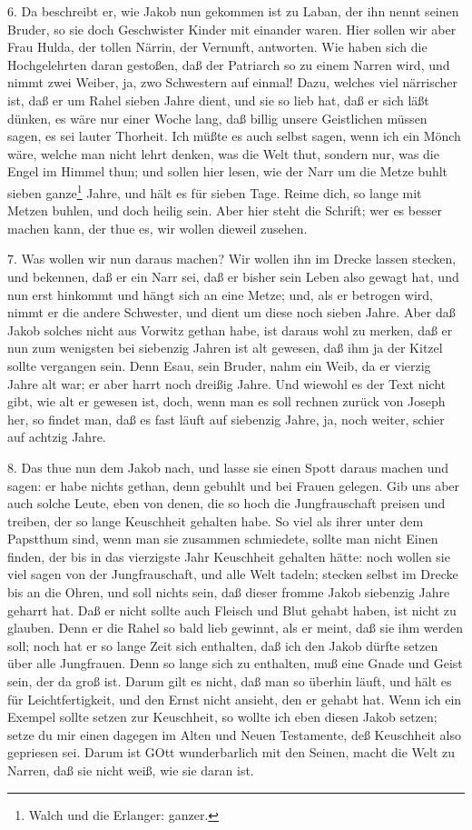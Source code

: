 6. Da beschreibt er, wie Jakob nun gekommen ist zu Laban, der ihn nennt seinen Bruder, so sie doch Geschwister Kinder mit einander waren. Hier sollen wir aber Frau Hulda, der tollen Närrin, der Vernunft, antworten. Wie haben sich die Hochgelehrten daran gestoßen, daß der Patriarch so zu einem Narren wird, und nimmt zwei Weiber, ja, zwo Schwestern auf einmal! Dazu, welches viel närrischer ist, daß er um Rahel sieben Jahre dient, und sie so lieb hat, daß er sich läßt dünken, es wäre nur einer Woche lang, daß billig unsere Geistlichen müssen sagen, es sei lauter Thorheit. Ich müßte es auch selbst sagen, wenn ich ein Mönch wäre, welche man nicht lehrt denken, was die Welt thut, sondern nur, was die Engel im Himmel thun; und sollen hier lesen, wie der Narr um die Metze buhlt sieben ganze\footnote{Walch und die Erlanger: ganzer.} Jahre, und hält es für sieben Tage. Reime dich, so lange mit Metzen buhlen, und doch heilig sein. Aber hier steht die Schrift; wer es besser machen kann, der thue es, wir wollen dieweil zusehen.


7. Was wollen wir nun daraus machen? Wir wollen ihn im Drecke lassen stecken, und bekennen, daß er ein Narr sei, daß er bisher sein Leben also gewagt hat, und nun erst hinkommt und hängt sich an eine Metze; und, als er betrogen wird, nimmt er die andere Schwester, und dient um diese noch sieben Jahre. Aber daß Jakob solches nicht aus Vorwitz gethan habe, ist daraus wohl zu merken, daß er nun zum wenigsten bei siebenzig Jahren ist alt gewesen, daß ihm ja der Kitzel sollte vergangen sein. Denn Esau, sein Bruder, nahm ein Weib, da er vierzig Jahre alt war; er aber harrt noch dreißig Jahre. Und wiewohl es der Text nicht gibt, wie alt er gewesen ist, doch, wenn man es soll rechnen zurück von Joseph her, so findet man, daß es fast läuft auf siebenzig Jahre, ja, noch weiter, schier auf achtzig Jahre.

8. Das thue nun dem Jakob nach, und lasse sie einen Spott daraus machen und sagen: er habe nichts gethan, denn gebuhlt und bei Frauen gelegen. Gib uns aber auch solche Leute, eben von denen, die so hoch die Jungfrauschaft preisen und treiben, der so lange Keuschheit gehalten habe. So viel als ihrer unter dem Papstthum sind, wenn man sie zusammen schmiedete, sollte man nicht Einen finden, der bis in das vierzigste Jahr Keuschheit gehalten hätte: noch wollen sie viel sagen von der Jungfrauschaft, und alle Welt tadeln; stecken selbst im Drecke bis an die Ohren, und soll nichts sein, daß dieser fromme Jakob siebenzig Jahre geharrt hat. Daß er nicht sollte auch Fleisch und Blut gehabt haben, ist nicht zu glauben. Denn er die Rahel so bald lieb gewinnt, als er meint, daß sie ihm werden soll; noch hat er so lange Zeit sich enthalten, daß ich den Jakob dürfte setzen über alle Jungfrauen. Denn so lange sich zu enthalten, muß eine Gnade und Geist sein, der da groß ist. Darum gilt es nicht, daß man so überhin läuft, und hält es für Leichtfertigkeit, und den Ernst nicht ansieht, den er gehabt hat. Wenn ich ein Exempel sollte setzen zur Keuschheit, so wollte ich eben diesen Jakob setzen; setze du mir einen dagegen im Alten und Neuen Testamente, deß Keuschheit also gepriesen sei. Darum ist GOtt wunderbarlich mit den Seinen, macht die Welt zu Narren, daß sie nicht weiß, wie sie daran ist.

